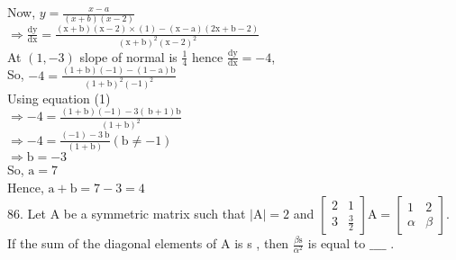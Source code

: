\documentclass[10pt]{article}
\begin{document}
Now, \(y=\frac{x-a}{(x+b)(x-2)}\)\\
\(\Rightarrow \frac{\mathrm{dy}}{\mathrm{dx}}=\frac{(\mathrm{x}+\mathrm{b})(\mathrm{x}-2) \times(1)-(\mathrm{x}-\mathrm{a})(2 \mathrm{x}+\mathrm{b}-2)}{(\mathrm{x}+\mathrm{b})^{2}(\mathrm{x}-2)^{2}}\)\\
At \((1,-3)\) slope of normal is \(\frac{1}{4}\) hence \(\frac{\mathrm{dy}}{\mathrm{dx}}=-4\),\\
So, \(-4=\frac{(1+\mathrm{b})(-1)-(1-\mathrm{a}) \mathrm{b}}{(1+\mathrm{b})^{2}(-1)^{2}}\)\\
Using equation (1)\\
\(\Rightarrow-4=\frac{(1+\mathrm{b})(-1)-3(\mathrm{~b}+1) \mathrm{b}}{(1+\mathrm{b})^{2}}\)\\
\(\Rightarrow-4=\frac{(-1)-3 \mathrm{~b}}{(1+\mathrm{b})}(\mathrm{b} \neq-1)\)\\
\(\Rightarrow \mathrm{b}=-3\)\\
So, \(\mathrm{a}=7\)\\
Hence, \(\mathrm{a}+\mathrm{b}=7-3=4\)\\
86. Let A be a symmetric matrix such that \(|\mathrm{A}|=2\) and \(\left[\begin{array}{cc}2 & 1 \\ 3 & \frac{3}{2}\end{array}\right] \mathrm{A}=\left[\begin{array}{cc}1 & 2 \\ \alpha & \beta\end{array}\right]\). If the sum of the diagonal elements of A is s , then \(\frac{\beta \mathrm{s}}{\alpha^{2}}\) is equal to \(\_\_\_\_\) .
\end{document}
